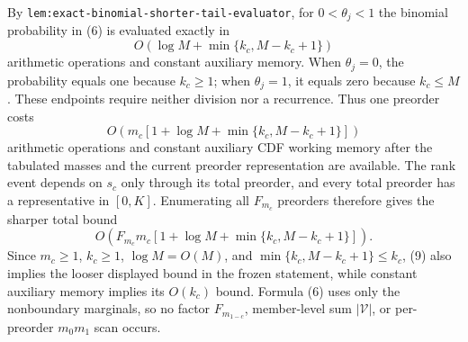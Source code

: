 By \texttt{lem:exact-binomial-shorter-tail-evaluator}, for \(0<\theta_j<1\) the binomial probability in (6) is evaluated exactly in
\[
O\!\left(\log M+\min\{k_c,M-k_c+1\}\right)
\tag{7}
\]
arithmetic operations and constant auxiliary memory. When \(\theta_j=0\), the probability equals one because \(k_c\ge1\); when \(\theta_j=1\), it equals zero because \(k_c\le M\). These endpoints require neither division nor a recurrence. Thus one preorder costs
\[
O\!\left(m_c\left[1+\log M+\min\{k_c,M-k_c+1\}\right]\right)
\tag{8}
\]
arithmetic operations and constant auxiliary CDF working memory after the tabulated masses and the current preorder representation are available. The rank event depends on \(s_c\) only through its total preorder, and every total preorder has a representative in \([0,K]\). Enumerating all \(F_{m_c}\) preorders therefore gives the sharper total bound
\[
O\!\left(F_{m_c}m_c\left[1+\log M+\min\{k_c,M-k_c+1\}\right]\right).
\tag{9}
\]
Since \(m_c\ge1\), \(k_c\ge1\), \(\log M=O(M)\), and \(\min\{k_c,M-k_c+1\}\le k_c\), (9) also implies the looser displayed bound in the frozen statement, while constant auxiliary memory implies its \(O(k_c)\) bound. Formula (6) uses only the nonboundary marginals, so no factor \(F_{m_{1-c}}\), member-level sum \(|\mathcal V|\), or per-preorder \(m_0m_1\) scan occurs.